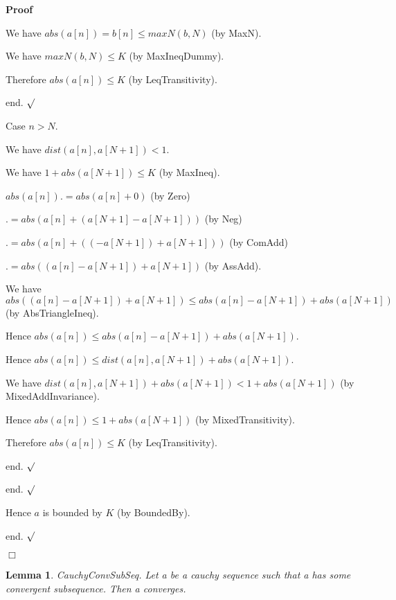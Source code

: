 \documentclass{article}
\newenvironment{forthel}{\begin{leftbar}}{\end{leftbar}}
\newenvironment{proof}{\noindent\textbf{Proof\ }}{\hspace*{\fill}$\Box$\medskip}
\newenvironment{subproof}{\begin{list}{}{}
		\item[\text{Proof}]}{\hfill $\surd$ \end{list}}
\newtheorem{lemma}{Lemma}
\begin{document}
\begin{forthel}
\begin{proof}
\begin{subproof}
\begin{subproof}
				\begin{subproof}
					We have $abs(a[n]) = b[n] \leq maxN(b,N)$ (by MaxN).
		
					We have $maxN(b,N) \leq K$ (by MaxIneqDummy).
		
					Therefore $abs(a[n]) \leq K$ (by LeqTransitivity).
		
				end.
				\end{subproof}	
		
				Case $n > N$.
		
				\begin{subproof}
					We have $dist(a[n],a[N + 1]) < 1$.
		
					We have $1 + abs(a[N + 1]) \leq K$ (by MaxIneq).
		
					$abs(a[n]) .= abs(a[n] + 0)$ (by Zero)
					
					$.= abs(a[n] + (a[N + 1] - a[N + 1]))$ (by Neg)
					
					$.= abs(a[n] + ((-a[N + 1]) + a[N + 1]))$ (by ComAdd)
					
					$.= abs((a[n] - a[N + 1]) + a[N + 1])$ (by AssAdd).
		
					We have $abs((a[n] - a[N + 1]) + a[N + 1]) \leq abs(a[n] - a[N + 1]) + abs(a[N + 1])$ (by AbsTriangleIneq).
		
					Hence $abs(a[n]) \leq abs(a[n] - a[N + 1]) + abs(a[N + 1])$.
		
					Hence $abs(a[n]) \leq dist(a[n],a[N + 1]) + abs(a[N + 1])$.
		
					We have $dist(a[n],a[N + 1]) + abs(a[N + 1]) < 1 + abs(a[N + 1])$ (by MixedAddInvariance).
		
					Hence $abs(a[n]) \leq 1 + abs(a[N + 1])$ (by MixedTransitivity).
		
					Therefore $abs(a[n]) \leq K$ (by LeqTransitivity).
		
				end.
				\end{subproof}
			
			end.					
			\end{subproof}
		
			Hence $a$ is bounded by $K$ (by BoundedBy).		
			
			end.
		\end{subproof}
	\end{proof}
	
	\begin{lemma}
		CauchyConvSubSeq.
		Let a be a cauchy sequence such that a has some convergent subsequence. Then a converges.
	\end{lemma}
	

\end{forthel}
\end{document}
